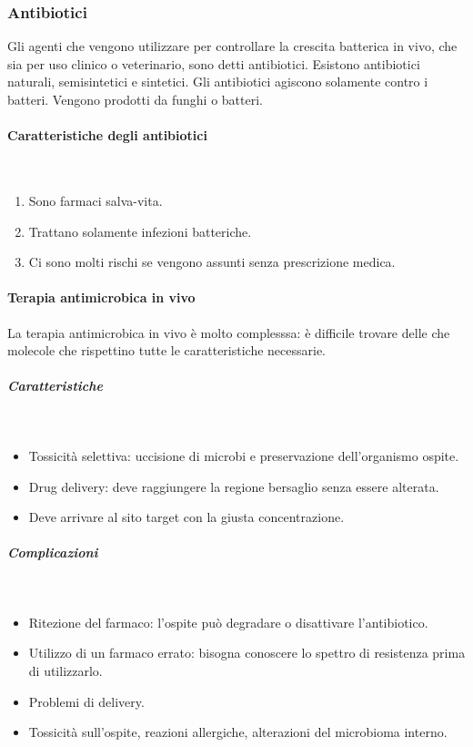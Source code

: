 		\subsubsection{Antibiotici}
		Gli agenti che vengono utilizzare per controllare la crescita batterica in vivo, che sia per uso clinico o veterinario, sono detti antibiotici. 
		Esistono antibiotici naturali, semisintetici e sintetici. 
		Gli antibiotici agiscono solamente contro i batteri.
		Vengono prodotti da funghi o batteri.

			\paragraph{Caratteristiche degli antibiotici}\mbox{}\\
			\begin{multicols}{2}
				\begin{enumerate}
    					\item Sono farmaci salva-vita.
    					\item Trattano solamente infezioni batteriche. 
    					\item Ci sono molti rischi se vengono assunti senza prescrizione medica.
				\end{enumerate}
			\end{multicols}

			\paragraph{Terapia antimicrobica in vivo}
			La terapia antimicrobica in vivo è molto complesssa: è difficile trovare delle che molecole che rispettino tutte le caratteristiche necessarie. 
				
				\subparagraph{Caratteristiche}\mbox{}\\
				\begin{multicols}{2}
					\begin{itemize}
						\item Tossicit\`a selettiva: uccisione di microbi e preservazione dell'organismo ospite.
						\item Drug delivery: deve raggiungere la regione bersaglio senza essere alterata.
						\item Deve arrivare al sito target con la giusta concentrazione.
					\end{itemize}
				\end{multicols}

				\subparagraph{Complicazioni}\mbox{}\\
				\begin{multicols}{2}
					\begin{itemize}
    						\item Ritezione del farmaco: l'ospite può degradare o disattivare l'antibiotico. 
    						\item Utilizzo di un farmaco errato: bisogna conoscere lo spettro di resistenza prima di utilizzarlo. 
    						\item Problemi di delivery. 
    						\item Tossicità sull'ospite, reazioni allergiche, alterazioni del microbioma interno.
					\end{itemize}
				\end{multicols}

